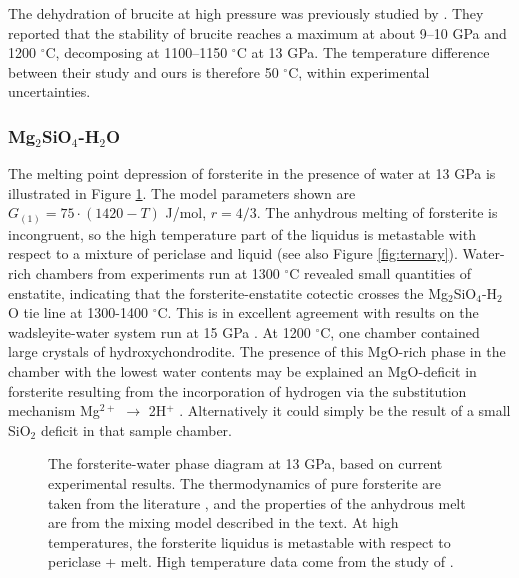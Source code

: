 \documentclass[review]{elsarticle}
\begin{document}
The dehydration of brucite at high pressure was previously studied by \cite{FIYKFO2005}. They reported that the stability of brucite reaches a maximum at about 9--10 GPa and 1200 $^{\circ}$C, decomposing at 1100--1150 $^{\circ}$C at 13 GPa. The temperature difference between their study and ours is therefore 50 $^{\circ}$C, within experimental uncertainties. 


\clearpage
\subsubsection{Mg$_2$SiO$_4$-H$_2$O}
The melting point depression of forsterite in the presence of water at 13 GPa is illustrated in Figure \ref{fig:foH}. The model parameters shown are $G_{(1)} = 75 \cdot (1420-T)$ J/mol, $r=4/3$. The anhydrous melting of forsterite is incongruent, so the high temperature part of the liquidus is metastable with respect to a mixture of periclase and liquid (see also Figure \ref{fig:ternary}). Water-rich chambers from experiments run at 1300 $^{\circ}$C revealed small quantities of enstatite, indicating that the forsterite-enstatite cotectic crosses the Mg$_2$SiO$_4$-H$_2$O tie line at 1300-1400 $^{\circ}$C. This is in excellent agreement with results on the wadsleyite-water system run at 15 GPa \citep{DDFK2005, LSOK2011}. At 1200 $^{\circ}$C, one chamber contained large crystals of hydroxychondrodite. The presence of this MgO-rich phase in the chamber with the lowest water contents may be explained an MgO-deficit in forsterite resulting from the incorporation of hydrogen via the substitution mechanism Mg$^{2+}$ $\rightarrow$ 2H$^+$ \citep{KB2006}. Alternatively it could simply be the result of a small SiO$_2$ deficit in that sample chamber. 

\begin{figure}[ht!]
  \centering
      \caption{The forsterite-water phase diagram at 13 GPa, based on current experimental results. The thermodynamics of pure forsterite are taken from the literature \citep{SLB2011}, and the properties of the anhydrous melt are from the mixing model described in the text. At high temperatures, the forsterite liquidus is metastable with respect to periclase + melt. High temperature data come from the study of \cite{NDMF2015}.}
  \label{fig:foH}
\end{figure}
\clearpage
\end{document}
